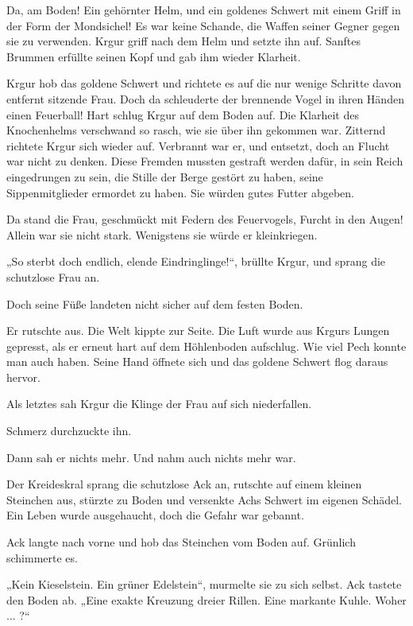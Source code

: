 Da, am Boden! Ein gehörnter Helm, und ein goldenes Schwert mit einem Griff in der Form der Mondsichel! Es war keine Schande, die Waffen seiner Gegner gegen sie zu verwenden. Krgur griff nach dem Helm und setzte ihn auf. Sanftes Brummen erfüllte seinen Kopf und gab ihm wieder Klarheit.

Krgur hob das goldene Schwert und richtete es auf die nur wenige Schritte davon entfernt sitzende Frau. Doch da schleuderte der brennende Vogel in ihren Händen einen Feuerball! Hart schlug Krgur auf dem Boden auf. Die Klarheit des Knochenhelms verschwand so rasch, wie sie über ihn gekommen war. Zitternd richtete Krgur sich wieder auf. Verbrannt war er, und entsetzt, doch an Flucht war nicht zu denken. Diese Fremden mussten gestraft werden dafür, in sein Reich eingedrungen zu sein, die Stille der Berge gestört zu haben, seine Sippenmitglieder ermordet zu haben. Sie würden gutes Futter abgeben.

Da stand die Frau, geschmückt mit Federn des Feuervogels, Furcht in den Augen! Allein war sie nicht stark. Wenigstens sie würde er kleinkriegen.

„So sterbt doch endlich, elende Eindringlinge!“, brüllte Krgur, und sprang die schutzlose Frau an.

Doch seine Füße landeten nicht sicher auf dem festen Boden.

Er rutschte aus. Die Welt kippte zur Seite. Die Luft wurde aus Krgurs Lungen gepresst, als er erneut hart auf dem Höhlenboden aufschlug. Wie viel Pech konnte man auch haben. Seine Hand öffnete sich und das goldene Schwert flog daraus hervor.

Als letztes sah Krgur die Klinge der Frau auf sich niederfallen.

Schmerz durchzuckte ihn.

Dann sah er nichts mehr. Und nahm auch nichts mehr war.



\trennzeichen



Der Kreideskral sprang die schutzlose Ack an, rutschte auf einem kleinen Steinchen aus, stürzte zu Boden und versenkte Achs Schwert im eigenen Schädel. Ein Leben wurde ausgehaucht, doch die Gefahr war gebannt.

Ack langte nach vorne und hob das Steinchen vom Boden auf. Grünlich schimmerte es.

„Kein Kieselstein. Ein grüner Edelstein“, murmelte sie zu sich selbst. Ack tastete den Boden ab. „Eine exakte Kreuzung dreier Rillen. Eine markante Kuhle. Woher ... ?“

